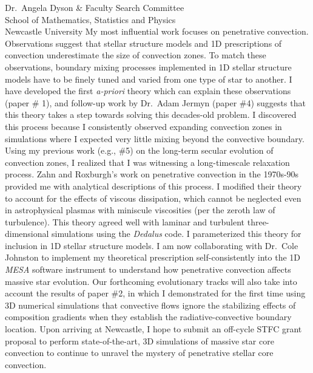 \documentclass[12pt, a4paper]{letter}
\begin{document}
\begin{letter}{
        Dr.~Angela Dyson \& Faculty Search Committee \\
        School of Mathematics, Statistics and Physics \\
        Newcastle University}
    My most influential work focuses on penetrative convection.
    Observations suggest that stellar structure models and 1D prescriptions of convection underestimate the size of convection zones.
    To match these observations, boundary mixing processes implemented in 1D stellar structure models have to be finely tuned and varied from one type of star to another.
    I have developed the first \emph{a-priori} theory which can explain these observations (paper \# 1), and follow-up work by Dr.~Adam Jermyn (paper \#4) suggests that this theory takes a step towards solving this decades-old problem.
    I discovered this process because I consistently observed expanding convection zones in simulations where I expected very little mixing beyond the convective boundary.
    Using my previous work (e.g., \#5) on the long-term secular evolution of convection zones, I realized that I was witnessing a long-timescale relaxation process.
    Zahn and Roxburgh's work on penetrative convection in the 1970s-90s provided me with analytical descriptions of this process.
    I modified their theory to account for the effects of viscous dissipation, which cannot be neglected even in astrophysical plasmas with miniscule viscosities (per the zeroth law of turbulence).
    This theory agreed well with laminar and turbulent three-dimensional simulations using the \emph{Dedalus} code.
    I parameterized this theory for inclusion in 1D stellar structure models.
    I am now collaborating with Dr.~Cole Johnston to implement my theoretical prescription self-consistently into the 1D \emph{MESA} software instrument to understand how penetrative convection affects massive star evolution.
    Our forthcoming evolutionary tracks will also take into account the results of paper \#2, in which I demonstrated for the first time using 3D numerical simulations that convective flows ignore the stabilizing effects of composition gradients when they establish the radiative-convective boundary location.
    Upon arriving at Newcastle, I hope to submit an off-cycle STFC grant proposal to perform state-of-the-art, 3D simulations of massive star core convection to continue to unravel the mystery of penetrative stellar core convection.


\end{letter}
\end{document}
